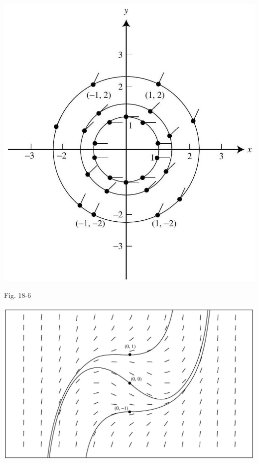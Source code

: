 \documentclass[10pt]{article}
\begin{document}
\begin{center}
\includegraphics[max width=\textwidth]{2024_04_03_5bb5b4275a64cb9887d1g-180}
\end{center}

Fig. 18-6

\begin{center}
\includegraphics[max width=\textwidth]{2024_04_03_5bb5b4275a64cb9887d1g-180(1)}
\end{center}
\end{document}
